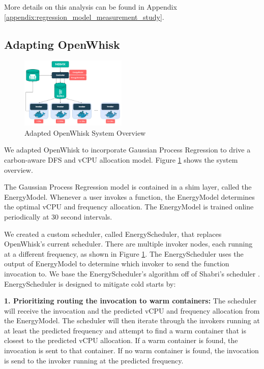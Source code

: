 \documentclass[times, 10pt,twocolumn]{article}
\begin{document}
More details on this analysis can be found in Appendix \ref{appendix:regression_model_measurement_study}.


\subsection{Adapting OpenWhisk}

\begin{figure}[ht]
   \centering
   \includegraphics[width=0.45\textwidth]{imgs/Adapted_OW_System_Overview.png}
   \caption{Adapted OpenWhisk System Overview}
   \label{fig:adapted_ow_system_overview}
 \end{figure}

We adapted OpenWhisk to incorporate Gaussian Process Regression to drive a carbon-aware DFS and vCPU allocation model. Figure \ref{fig:adapted_ow_system_overview} shows the system overview.

The Gaussian Process Regression model is contained in a shim layer, called the EnergyModel. Whenever a user invokes a function, the EnergyModel determines the optimal vCPU and frequency allocation. The EnergyModel is trained online periodically at 30 second intervals.

We created a custom scheduler, called EnergyScheduler, that replaces OpenWhisk's current scheduler. There are multiple invoker nodes, each running at a different frequency, as shown in Figure \ref{fig:adapted_ow_system_overview}. The EnergyScheduler uses the output of EnergyModel to determine which invoker to send the function invocation to. We base the EnergyScheduler's algorithm off of Shabri's scheduler \cite{sinha2024shabari}. EnergyScheduler is designed to mitigate cold starts by:

\textbf{1. Prioritizing routing the invocation to warm containers: } The scheduler will receive the invocation and the predicted vCPU and frequency allocation from the EnergyModel. The scheduler will then iterate through the invokers running at at least the predicted frequency and attempt to find a warm container that is closest to the predicted vCPU allocation. If a warm container is found, the invocation is sent to that container. If no warm container is found, the invocation is send to the invoker running at the predicted frequency.
\end{document}

